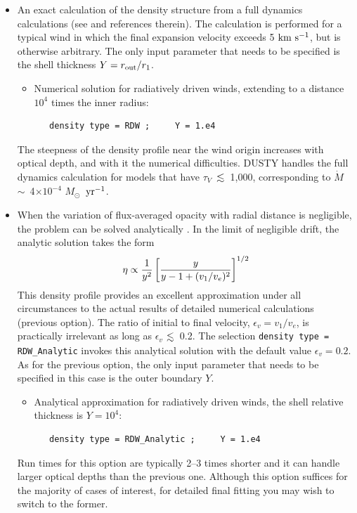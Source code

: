 \documentclass[11pt]{article}
\def\E#1{\hbox{$10^{#1}$}}
\def\eq#1{\begin{equation} #1 \end{equation}}
\def\about  {\hbox{$\sim$}}
\def\la    {\hbox{$\mathrel{\hbox{\raise.3ex\hbox{$<$}\llap
                                {\lower.8ex\hbox{$\sim$}}}}$}}
\def\x      {\hbox{$\times$}}
\def\tV     {\hbox{$\tau_V$}}
\def\Mo     {\hbox{$M_{\odot}$}}
\def\Mdot   {\hbox{$\dot{M}$}}
\def\kms    {\hbox{$\rm km\ s^{-1}$}}
\begin{document}
\begin{itemize}
\item An exact calculation of the density structure from a full
  dynamics calculations (see \cite{IE95,EI01} and references therein).
  The calculation is performed for a typical wind in which the final
  expansion velocity exceeds 5 \kms, but is otherwise arbitrary. The
  only input parameter that needs to be specified is the shell
  thickness $Y = r_{\rm out}/r_1$.

  \begin{itemize}
  \item Numerical solution for radiatively driven winds, extending to
    a distance $10^4$ times the inner radius:

\begin{verbatim}
   density type = RDW ;     Y = 1.e4
\end{verbatim}
  \end{itemize}
  The steepness of the density profile near the wind origin increases
  with optical depth, and with it the numerical difficulties.  DUSTY
  handles the full dynamics calculation for models that have \tV\ \la\
  1,000, corresponding to \Mdot\ \about\ 4\x\E{-4} \Mo\ $\rm yr^{-1}$.

\item When the variation of flux-averaged opacity with radial distance
  is negligible, the problem can be solved analytically \cite{EI01}.
  In the limit of negligible drift, the analytic solution takes the
  form \eq{ \eta \propto {1\over y^2}\left[{y \over y - 1 +
        (v_1/v_e)^2}\right]^{1/2} } This density profile provides an
  excellent approximation under all circumstances to the actual
  results of detailed numerical calculations (previous option). The
  ratio of initial to final velocity, $\epsilon_v = v_1/v_e$, is
  practically irrelevant as long as $\epsilon_v$ \la\ 0.2. The
  selection {\tt density type = RDW\_Analytic} invokes this analytical
  solution with the default value $\epsilon_v = 0.2$. As for the
  previous option, the only input parameter that needs to be specified
  in this case is the outer boundary $Y$.

  \begin{itemize}
  \item Analytical approximation for radiatively driven winds, the
    shell relative thickness is $Y = 10^4$:

\begin{verbatim}
   density type = RDW_Analytic ;     Y = 1.e4
\end{verbatim}

\end{itemize}
Run times for this option are typically 2--3 times shorter and it can
handle larger optical depths than the previous one. Although this
option suffices for the majority of cases of interest, for detailed
final fitting you may wish to switch to the former.

\end{itemize}
\end{document}

